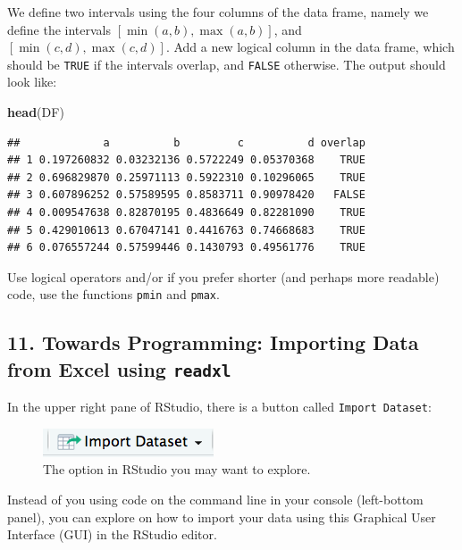 \documentclass[]{article}
\newenvironment{Shaded}{\begin{snugshade}}{\end{snugshade}}
\newcommand{\KeywordTok}[1]{\textcolor[rgb]{0.13,0.29,0.53}{\textbf{#1}}}
\newcommand{\NormalTok}[1]{#1}
\begin{document}
We define two intervals using the four columns of the data frame, namely
we define the intervals \([\min(a,b), \max(a,b)]\), and
\([\min(c,d), \max(c,d)]\). Add a new logical column in the data frame,
which should be \texttt{TRUE} if the intervals overlap, and
\texttt{FALSE} otherwise. The output should look like:

\begin{Shaded}
\begin{Highlighting}[]
\KeywordTok{head}\NormalTok{(DF)}
\end{Highlighting}
\end{Shaded}

\begin{verbatim}
##             a          b         c          d overlap
## 1 0.197260832 0.03232136 0.5722249 0.05370368    TRUE
## 2 0.696829870 0.25971113 0.5922310 0.10296065    TRUE
## 3 0.607896252 0.57589595 0.8583711 0.90978420   FALSE
## 4 0.009547638 0.82870195 0.4836649 0.82281090    TRUE
## 5 0.429010613 0.67047141 0.4416763 0.74668683    TRUE
## 6 0.076557244 0.57599446 0.1430793 0.49561776    TRUE
\end{verbatim}

Use logical operators and/or if you prefer shorter (and perhaps more
readable) code, use the functions \texttt{pmin} and \texttt{pmax}.

\hypertarget{towards-programming-importing-data-from-excel-using-readxl}{%
\subsection{\texorpdfstring{11. Towards Programming: Importing Data from
Excel using
\texttt{readxl}}{11. Towards Programming: Importing Data from Excel using readxl}}\label{towards-programming-importing-data-from-excel-using-readxl}}

In the upper right pane of RStudio, there is a button called
\texttt{Import\ Dataset}: \FloatBarrier

\begin{figure}[ht]
\centering
\includegraphics{0_image/Import_Dataset.png}
\caption{The option in RStudio you may want to explore.}
\end{figure}

Instead of you using code on the command line in your console
(left-bottom panel), you can explore on how to import your data using
this Graphical User Interface (GUI) in the RStudio editor.
\end{document}
